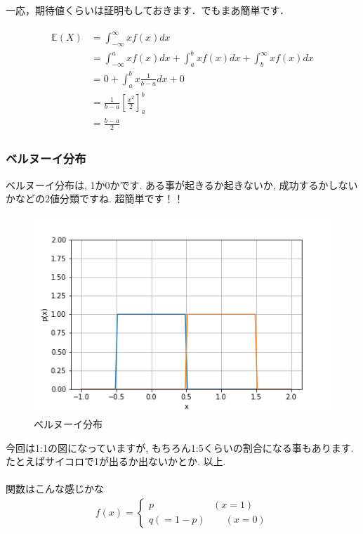 \documentclass[11pt,a4paper]{jsarticle}                    %
\begin{document}
一応，期待値くらいは証明もしておきます．でもまあ簡単です．

\begin{eqnarray}
\begin{split}
\mathbb{E}(X)  &= \int_{-\infty}^{\infty} xf(x) dx \\
&= \int_{-\infty}^{a} xf(x) dx + \int_{a}^{b} xf(x) dx + \int_{b}^{\infty} xf(x) dx \\
&= 0 + \int_{a}^{b} x\frac{1}{b-a} dx + 0\\
&= \frac{1}{b-a}\left[\frac{x^2}{2}\right]_a^b\\
& = \frac{b-a}{2}
\end{split}
\end{eqnarray}

\subsubsection{ベルヌーイ分布}
ベルヌーイ分布は, 1か0かです. ある事が起きるか起きないか, 成功するかしないかなどの2値分類ですね. 超簡単です！！\\

\begin{figure}[H]
\label{im:bernoulli}
  \centering
  \includegraphics[width=120mm,bb=0 0 432 288]{../figures/bernoulli.png}
  \caption{ベルヌーイ分布}
\end{figure}
今回は1:1の図になっていますが, もちろん1:5くらいの割合になる事もあります. たとえばサイコロで1が出るか出ないかとか. 以上.\\
\\
関数はこんな感じかな
\begin{eqnarray}
f(x)=
  \left\{
    \begin{array}{l}
      p \qquad \qquad \qquad (x = 1) \\
      q(=1-p)  \qquad (x=0)
    \end{array}
  \right.
\end{eqnarray}
\end{document}
